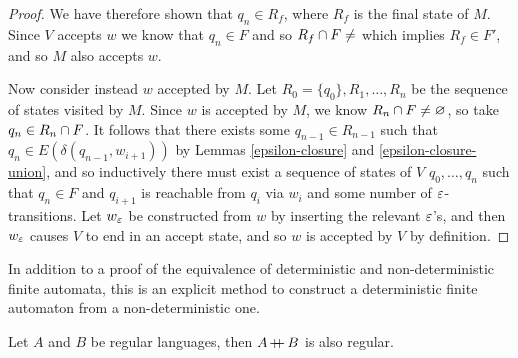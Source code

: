 \begin{proof}
    We have therefore shown that $q_n \in R_f$, where $R_f$ is the final state of $M$. Since $V$ accepts $w$ we know that $q_n \in F$ and so $R_f \intersection F \neq \empty$ which implies $R_f \in F'$, and so $M$ also accepts $w$.

    Now consider instead $w$ accepted by $M$. Let $R_0 = \{q_0\}, R_1, \ldots, R_n$ be the sequence of states visited by $M$. Since $w$ is accepted by $M$, we know $R_n \cap F \neq \varnothing$, so take $q_n \in R_n \cap F$. It follows that there exists some $q_{n-1} \in R_{n-1}$ such that $q_n \in E(\delta(q_{n-1}, w_{i+1}))$ by Lemmas \ref{epsilon-closure} and \ref{epsilon-closure-union}, and so inductively there must exist a sequence of states of $V$ $q_0, \ldots, q_n$ such that $q_n \in F$ and $q_{i+1}$ is reachable from $q_i$ via $w_i$ and some number of $\varepsilon$-transitions. Let $w_{\varepsilon}$ be constructed from $w$ by inserting the relevant $\varepsilon$'s, and then $w_{\varepsilon}$ causes $V$ to end in an accept state, and so $w$ is accepted by $V$ by definition.
\end{proof}

\begin{rmk}
    In addition to a proof of the equivalence of deterministic and non-deterministic finite automata, this is an explicit method to construct a deterministic finite automaton from a non-deterministic one.
\end{rmk}

\begin{thm}\label{regular-language-concatenation}
    Let $A$ and $B$ be regular languages, then $A \kern-0.2ex+\kern-1.5ex+\kern0.4ex B$ is also regular.
\end{thm}

